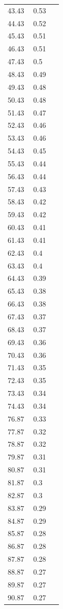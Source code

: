 \documentclass{article}
\begin{document}
\begin{longtable}{p{0.43\linewidth} p{0.49\linewidth}}
43.43 & 0.53 \\
44.43 & 0.52 \\
45.43 & 0.51 \\
46.43 & 0.51 \\
47.43 & 0.5 \\
48.43 & 0.49 \\
49.43 & 0.48 \\
50.43 & 0.48 \\
51.43 & 0.47 \\
52.43 & 0.46 \\
53.43 & 0.46 \\
54.43 & 0.45 \\
55.43 & 0.44 \\
56.43 & 0.44 \\
57.43 & 0.43 \\
58.43 & 0.42 \\
59.43 & 0.42 \\
60.43 & 0.41 \\
61.43 & 0.41 \\
62.43 & 0.4 \\
63.43 & 0.4 \\
64.43 & 0.39 \\
65.43 & 0.38 \\
66.43 & 0.38 \\
67.43 & 0.37 \\
68.43 & 0.37 \\
69.43 & 0.36 \\
70.43 & 0.36 \\
71.43 & 0.35 \\
72.43 & 0.35 \\
73.43 & 0.34 \\
74.43 & 0.34 \\
76.87 & 0.33 \\
77.87 & 0.32 \\
78.87 & 0.32 \\
79.87 & 0.31 \\
80.87 & 0.31 \\
81.87 & 0.3 \\
82.87 & 0.3 \\
83.87 & 0.29 \\
84.87 & 0.29 \\
85.87 & 0.28 \\
86.87 & 0.28 \\
87.87 & 0.28 \\
88.87 & 0.27 \\
89.87 & 0.27 \\
90.87 & 0.27 \\

\end{longtable}
\end{document}
